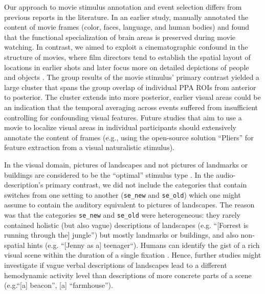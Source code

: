 \documentclass[english,11pt]{article}
\begin{document}
Our approach to movie stimulus annotation and event selection differs from
previous reports in the literature.
In an earlier study, \citet{bartels2004mapping} manually annotated the content
of movie frames (color, faces, language, and human bodies) and found that the
functional specialization of brain areas is preserved during movie watching.
%
In contrast, we aimed to exploit a cinematographic confound in the structure of
movies, where
film directors tend to establish the spatial layout of locations in earlier
shots and later focus more on detailed depictions of people and objects
\citep{brown2012cinematography, katz1991film, mascelli1998five}.
The group results of the movie stimulus' primary contrast yielded a large
cluster that spans the group overlap of individual PPA ROIs from anterior to
posterior.
The cluster extends into more posterior, earlier visual areas could be an
indication that the temporal averaging across events suffered from insufficient
controlling for confounding visual features.
Future studies that aim to use a movie to localize visual areas in individual
participants should extensively annotate the content of frames (e.g., using the
open-source solution ``Pliers''\citep{mcnamara2017developing} for feature
extraction from a visual naturalistic stimulus).

In the visual domain, pictures of landscapes and not pictures of landmarks or
buildings are considered to be the ``optimal'' stimulus type
\citep{epstein2008parahippocampal}.
In the audio-description's primary contrast, we did not include the categories
that contain switches from one setting to another (\texttt{se\_new} and
\texttt{se\_old}) which one might assume to contain the auditory equivalent to
pictures of landscapes.
The reason was that the categories \texttt{se\_new} and \texttt{se\_old} were
heterogeneous: they rarely contained holistic (but also vague) descriptions of
landscapes (e.g.  ``[Forrest is running through the] jungle'') but mostly
landmarks or buildings, and also non-spatial hints (e.g. ``[Jenny as a]
teenager``).
Humans can identify the gist of a rich visual scene within the duration of a
single fixation \citep{henderson2003human}.
%
Hence, further studies might investigate if vague verbal descriptions of
landscapes lead to a different hemodynamic activity level than descriptions of
more concrete parts of a scene (e.g.``[a] beacon'', [a] ``farmhouse'').
\end{document}

